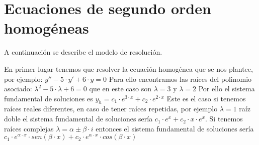 
\section{Ecuaciones de segundo orden homogéneas}

\begin{ejer}
	A continuación se describe el modelo de resolución.
\end{ejer}
\begin{sol}
	En primer lugar tenemos que resolver la ecuación homogénea que se nos plantee, por ejemplo:  
	$y'' - 5\cdot y' + 6\cdot y = 0$  
	Para ello encontramos las raíces del polinomio asociado:  
	$\lambda ^2 - 5\cdot \lambda + 6 = 0$ que en este caso son $\lambda = 3$ y $\lambda  = 2$  
	Por ello el sistema fundamental de soluciones es $y_h = c_1\cdot e^{3\cdot x} + c_2\cdot e^{2\cdot x}$  
	Este es el caso si tenemos raíces reales diferentes, en caso de tener raíces repetidas, por ejemplo $\lambda = 1$ raíz doble el sistema fundamental de soluciones sería $c_1\cdot e^x + c_2\cdot x\cdot e^x$.  
	Si tenemos raíces complejas $\lambda = \alpha \pm \beta \cdot i$ entonces el sistema fundamental de soluciones sería $c_1\cdot e^{\alpha \cdot x}\cdot sen(\beta \cdot x) + c_2\cdot e^{\alpha \cdot x}\cdot cos(\beta \cdot x)$
\end{sol}